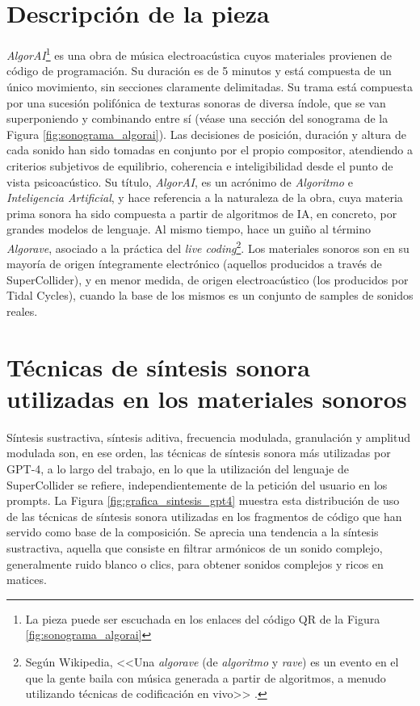 \section{Descripción de la pieza}

\emph{AlgorAI}\footnote{La pieza puede ser escuchada en los enlaces del código QR de la Figura \ref{fig:sonograma_algorai}} es una obra de música electroacústica cuyos materiales provienen de código de programación. Su duración es de 5 minutos y está compuesta de un único movimiento, sin secciones claramente delimitadas. Su trama está compuesta por una sucesión polifónica de texturas sonoras de diversa índole, que se van superponiendo y combinando entre sí (véase una sección del sonograma de la Figura \ref{fig:sonograma_algorai}). Las decisiones de posición, duración y altura de cada sonido han sido tomadas en conjunto por el propio compositor, atendiendo a criterios subjetivos de equilibrio, coherencia e inteligibilidad desde el punto de vista psicoacústico. Su título, \emph{AlgorAI}, es un acrónimo de \emph{Algoritmo} e \emph{Inteligencia Artificial}, y hace referencia a la naturaleza de la obra, cuya materia prima sonora ha sido compuesta a partir de algoritmos de IA, en concreto, por grandes modelos de lenguaje. Al mismo tiempo, hace un guiño al término \emph{Algorave}, asociado a la práctica del \emph{live coding}\footnote{Según Wikipedia, <<Una \emph{algorave} (de \emph{algoritmo} y \emph{rave}) es un evento en el que la gente baila con música generada a partir de algoritmos, a menudo utilizando técnicas de codificación en vivo>> \citep{Algorave2023}.}.  Los materiales sonoros son en su mayoría de origen íntegramente electrónico (aquellos producidos a través de SuperCollider), y en menor medida, de origen electroacústico (los producidos por Tidal Cycles), cuando la base de los mismos es un conjunto de {samples} de sonidos reales.


\section{Técnicas de síntesis sonora utilizadas en los materiales sonoros}

Síntesis sustractiva, síntesis aditiva, frecuencia modulada, granulación y amplitud modulada son, en ese orden, las técnicas de síntesis sonora más utilizadas por GPT-4, a lo largo del trabajo, en lo que la utilización del lenguaje de SuperCollider se refiere, independientemente de la petición del usuario en los prompts. La Figura \ref{fig:grafica_sintesis_gpt4} muestra esta distribución de uso de las técnicas de síntesis sonora utilizadas en los fragmentos de código que han servido como base de la composición. Se aprecia una tendencia a la síntesis sustractiva, aquella que consiste en filtrar armónicos de un sonido complejo, generalmente ruido blanco o clics, para obtener sonidos complejos y ricos en matices.

